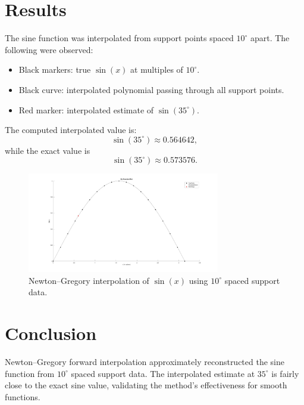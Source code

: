 \section*{Results}
The sine function was interpolated from support points spaced $10^\circ$ apart.
The following were observed:
\begin{itemize}
  \item Black markers: true $\sin(x)$ at multiples of $10^\circ$.
  \item Black curve: interpolated polynomial passing through all support points.
  \item Red marker: interpolated estimate of $\sin(35^\circ)$.
\end{itemize}

The computed interpolated value is:
\[
\sin(35^\circ) \approx 0.564642,
\]
while the exact value is
\[
\sin(35^\circ) \approx 0.573576.
\]

\begin{figure}[h!]
  \centering
  \includegraphics[width=0.75\textwidth]{a3.jpg}
  \caption{Newton–Gregory interpolation of $\sin(x)$ using $10^\circ$ spaced support data.}
\end{figure}

\section*{Conclusion}
Newton–Gregory forward interpolation approximately reconstructed the sine function
from $10^\circ$ spaced support data. The interpolated estimate at $35^\circ$
is fairly close to the exact sine value, validating the method’s effectiveness for
smooth functions.
